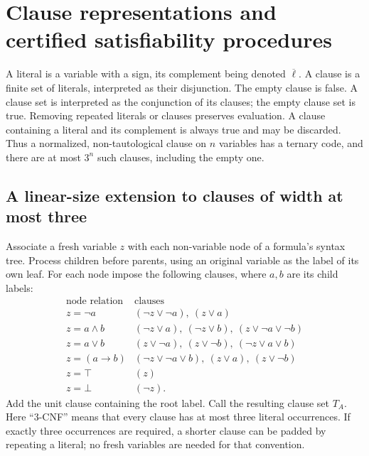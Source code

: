 \section{Clause representations and certified satisfiability procedures}
\label{ca-solvers}

A literal is a variable with a sign, its complement being denoted
$\overline\ell$.  A clause is a finite set of literals, interpreted as their
disjunction.  The empty clause is false.  A clause set is interpreted as the
conjunction of its clauses; the empty clause set is true.  Removing repeated
literals or clauses preserves evaluation.  A clause containing a literal
and its complement is always true and may be discarded.  Thus a normalized,
non-tautological clause on $n$ variables has a ternary code, and there are at
most $3^n$ such clauses, including the empty one.

\subsection{A linear-size extension to clauses of width at most three}

Associate a fresh variable $z$ with each non-variable node of a formula's
syntax tree.  Process children before parents, using an original variable
as the label of its own leaf.  For each node impose the following clauses,
where $a,b$ are its child labels:
\[
\begin{array}{c|l}
 \text{node relation}&\text{clauses}\\ \hline
 z=\neg a &(\neg z\vee\neg a),\ (z\vee a)\\
 z=a\wedge b &(\neg z\vee a),\ (\neg z\vee b),\
                   (z\vee\neg a\vee\neg b)\\
 z=a\vee b &(z\vee\neg a),\ (z\vee\neg b),\
                   (\neg z\vee a\vee b)\\
 z=(a\to b)&(\neg z\vee\neg a\vee b),\ (z\vee a),\
                   (z\vee\neg b)\\
 z=\top &(z)\\
 z=\bot &(\neg z).
\end{array}
\]
Add the unit clause containing the root label.  Call the resulting clause
set $T_A$.  Here ``3-CNF'' means that every clause has at most three literal
occurrences.  If exactly three occurrences are required, a shorter clause
can be padded by repeating a literal; no fresh variables are needed for that
convention.

